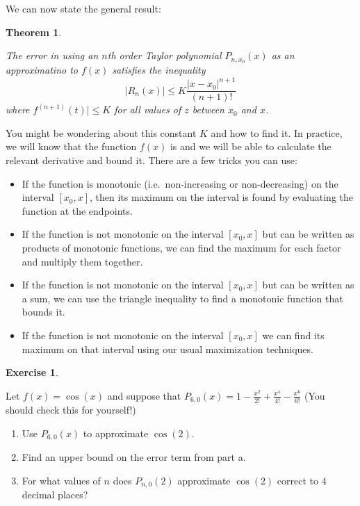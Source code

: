 \documentclass[
]{book}
\providecommand{\tightlist}{%
  \setlength{\itemsep}{0pt}\setlength{\parskip}{0pt}}
\newtheorem{theorem}{Theorem}[chapter]
\theoremstyle{definition}
\theoremstyle{definition}
\theoremstyle{definition}
\newtheorem{exercise}{Exercise}[chapter]
\theoremstyle{definition}
\theoremstyle{remark}
\begin{document}
We can now state the general result:

\begin{theorem}
\protect\hypertarget{thm:unlabeled-div-163}{}\label{thm:unlabeled-div-163}

The error in using an \(n\)th order Taylor polynomial \(P_{n, x_0}(x)\) as an approximatino to \(f(x)\) satisfies the inequality \[|R_n(x)|\leq  K \frac{|x-x_0|^{n+1}}{(n+1)!} \] where \(f^{(n+1)}(t)|\leq K\) for all values of \(z\) between \(x_0\) and \(x\).

\end{theorem}

You might be wondering about this constant \(K\) and how to find it. In practice, we will know that the function \(f(x)\) is and we will be able to calculate the relevant derivative and bound it. There are a few tricks you can use:

\begin{itemize}
\tightlist
\item
  If the function is monotonic (i.e.~non-increasing or non-decreasing) on the interval \([x_0,x]\), then its maximum on the interval is found by evaluating the function at the endpoints.
\item
  If the function is not monotonic on the interval \([x_0,x]\) but can be written as products of monotonic functions, we can find the maximum for each factor and multiply them together.
\item
  If the function is not monotonic on the interval \([x_0,x]\) but can be written as a sum, we can use the triangle inequality to find a monotonic function that bounds it.
\item
  If the function is not monotonic on the interval \([x_0,x]\) we can find its maximum on that interval using our usual maximization techniques.
\end{itemize}

\begin{exercise}
\protect\hypertarget{exr:unlabeled-div-164}{}\label{exr:unlabeled-div-164}

Let \(f(x)=\cos(x)\) and suppose that \(P_{6,0}(x)=1- \frac{x^2}{2!}+\frac{x^4}{4!}-\frac{x^6}{6!}\) (You should check this for yourself!)

\begin{enumerate}
\def\labelenumi{\alph{enumi}.}
\tightlist
\item
  Use \(P_{6,0}(x)\) to approximate \(\cos(2)\).
\item
  Find an upper bound on the error term from part a.
\item
  For what values of \(n\) does \(P_{n,0}(2)\) approximate \(\cos(2)\) correct to \(4\) decimal places?
\end{enumerate}

\end{exercise}
\end{document}
